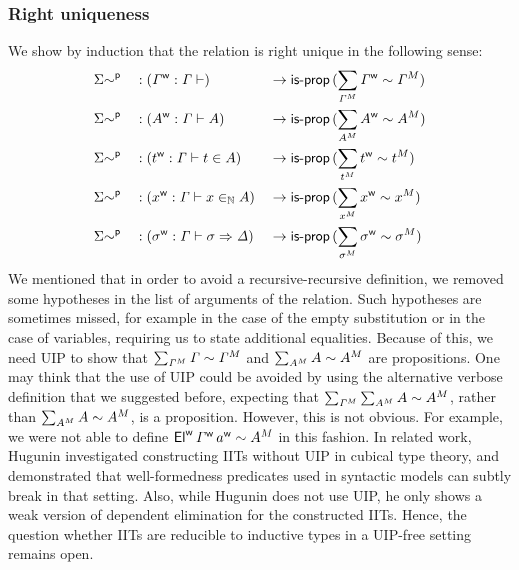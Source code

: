   \subsubsection{Right uniqueness}
  \label{sec:right_uniqueness}
  We show by induction that the relation is right unique in the following sense:
  \begin{alignat*}{5}
    &
    {\Sigma{\sim}}^{\mathsf{p}}
    && : ({\mathit{\Gamma}}^{\mathsf{w}} : \mathit{\Gamma} \vdash ) && \rightarrow
    \mathsf{is\text{-}prop}\, (\sum_{{\mathit{\Gamma}}^M} {\mathit{\Gamma}}^{\mathsf{w}} \sim {\mathit{\Gamma}}^M)
    \\
    &
    {\Sigma{\sim}}^{\mathsf{p}}
    && : ({A}^{\mathsf{w}} : \mathit{\Gamma} \vdash A) && \rightarrow
    \mathsf{is\text{-}prop}\, (\sum_{{A}^M} {A}^{\mathsf{w}} \sim {A}^M)
    \\
    &
    {\Sigma{\sim}}^{\mathsf{p}}
    && : ({t}^{\mathsf{w}} : \mathit{\Gamma} \vdash t \in A) && \rightarrow
    \mathsf{is\text{-}prop}\, (\sum_{{t}^M} {t}^{\mathsf{w}} \sim {t}^M)
    \\
    &
    {\Sigma{\sim}}^{\mathsf{p}}
    && : ({x}^{\mathsf{w}} : \mathit{\Gamma} \vdash x \in_{\mathbb{N}} A) && \rightarrow
    \mathsf{is\text{-}prop}\, (\sum_{{x}^M} {x}^{\mathsf{w}} \sim {x}^M)
    \\
    &
    {\Sigma{\sim}}^{\mathsf{p}}
    && : ({\sigma}^{\mathsf{w}} : \mathit{\Gamma} \vdash \sigma \Rightarrow \mathit{\Delta}) && \rightarrow
    \mathsf{is\text{-}prop}\, (\sum_{{\sigma}^M} {\sigma}^{\mathsf{w}} \sim {\sigma}^M)
  \end{alignat*}
  We mentioned that in order to avoid a recursive-recursive definition, we
  removed some hypotheses in the list of arguments of the relation. Such
  hypotheses are sometimes missed, for example in the case of the empty
  substitution or in the case of variables, requiring us to state additional
  equalities. Because of this, we need UIP to show that
  $\sum_{{\mathit{\Gamma}}^M}\mathit{\Gamma}\sim{\mathit{\Gamma}}^M$ and
  $\sum_{{A}^M}A\sim{A}^M$ are propositions.  One may think that the use
  of UIP could be avoided by using the alternative verbose definition that we
  suggested before, expecting that
  $\sum_{{\mathit{\Gamma}}^M}\sum_{{A}^M}A\sim{A}^M$, rather than
  $\sum_{{A}^M}A\sim{A}^M$, is a proposition.  However, this is not
  obvious. For example, we were not able to define
  ${\mathsf{El}}^{\mathsf{w}}\,{\mathit{\Gamma}}^{\mathsf{w}}\,{a}^{\mathsf{w}}\sim {A}^M$ in this fashion. In related work,
  Hugunin investigated constructing IITs without
  UIP \cite{jasper} in cubical type theory, and demonstrated
  that well-formedness predicates used in syntactic models can subtly break
  in that setting. Also, while Hugunin does not use UIP, he only shows a
  weak version of dependent elimination for the constructed IITs. Hence, the
  question whether IITs are reducible to inductive types in a UIP-free setting
  remains open.





